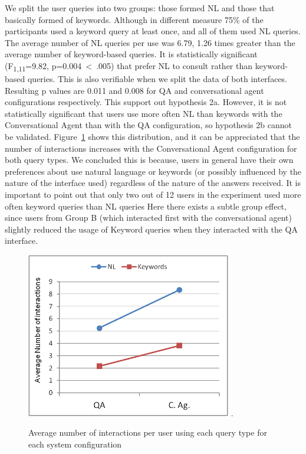 We split the user queries into two groups: those formed \ac{NL} and those that basically formed of keywords. Although in different measure 75\% of the participants used a keyword query at least once, and all of them used \ac{NL} queries. The average number of \ac{NL} queries per use was 6.79, 1.26 times greater than the average number of keyword-based queries. It is statistically significant (F\textsubscript{1,11}=9.82, p=0.004~\textless~.005) that prefer \ac{NL} to consult rather than keyword-based queries. This is also verifiable when we split the data of both interfaces. Resulting p values are 0.011 and 0.008 for \ac{QA} and conversational agent configurations respectively. This support out hypothesis 2a.
% 
However, it is not statistically significant that users use more often \ac{NL} than keywords with the Conversational Agent than with the QA configuration, so hypothesis 2b cannot be validated. Figure~\ref{fig:exp_querytype} shows this distribution, and it can be appreciated that the number of interactions increases with the Conversational Agent configuration for both query types.
We concluded this is because, users in general have their own preferences about use natural language or keywords (or possibly influenced by the nature of the interface used) regardless of the nature of the answers received.
It is important to point out that only two out of 12 users in the experiment used more often keyword queries than \ac{NL} queries
Here there exists a subtle group effect, since users from Group B (which interacted first with the conversational agent) slightly reduced the usage of Keyword queries when they interacted with the \ac{QA} interface.

\begin{figure}[!tbh]
  \centering
  \includegraphics[width=0.8\textwidth]{img/test/exp_querytype.png}
  \DeclareGraphicsExtensions.  
  \caption{Average number of interactions per user using each query type for each system configuration}
  \label{fig:exp_querytype}
\end{figure}

